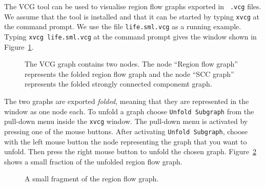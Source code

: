 \documentclass[12pt]{book}
\begin{document}
The 
%
VCG tool can be used to visualise region flow graphs exported in {\tt
  .vcg} files. We assume that the tool is installed and that it can be
started by typing \texttt{xvcg} at the command prompt.  We use the file
\texttt{life.sml.vcg} as a running example. Typing \mbox{\texttt{xvcg
    life.sml.vcg}} at the command prompt gives the window shown in
Figure~\ref{vcg1.fig}.
\begin{figure}
\begin{center}
\end{center}
\caption{The VCG graph contains two nodes. The
  node ``Region flow graph'' represents the folded region flow graph and
  the node ``SCC graph'' represents the folded strongly connected
  componemt graph.}
\label{vcg1.fig}
\end{figure}

The two graphs are exported \emph{folded}, meaning that they are
represented in the window as one node each. To unfold a graph choose
{\tt Unfold Subgraph} from the pull-down menu inside the {\tt xvcg}
window. The pull-down menu is activated by pressing one of the mouse
buttons. After activating {\tt Unfold Subgraph}, choose with the left mouse button the node
representing the graph that you want to unfold. Then press the right
mouse button to unfold the chosen graph. Figure~\ref{vcg2.fig}
shows a small fraction of the unfolded region flow graph.
\begin{figure}
\begin{center}
\end{center}
\caption{A small fragment of the region flow graph.}
\label{vcg2.fig}
\end{figure}
\end{document}

